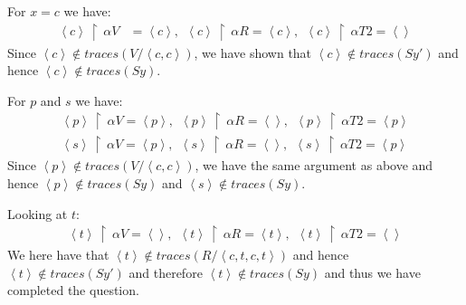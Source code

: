 \documentclass[11pt,a4paper]{article}
\def\filter{\,\upharpoonright\,}
\newcommand{\ab}[1]{\left \langle #1 \right \rangle}
\begin{document}
For $x = c$ we have:
\begin{align*}
    \ab{c} \filter \alpha V &= \ab{c},~~
    \ab{c} \filter \alpha R = \ab{c},~~
    \ab{c} \filter \alpha T2 = \ab{ }
\end{align*}
Since $\ab{c} \not \in traces(V/\ab{c,c})$, we have shown that $\ab{c} \not \in
traces(Sy')$ and hence $\ab{c} \not \in traces(Sy)$.

For $p$ and $s$ we have:
\begin{align*}
    \ab{p} \filter \alpha V = \ab{p},~~
    \ab{p} \filter \alpha R = \ab{ },~~
    \ab{p} \filter \alpha T2 = \ab{p} \\
    \ab{s} \filter \alpha V = \ab{p},~~
    \ab{s} \filter \alpha R = \ab{ },~~
    \ab{s} \filter \alpha T2 = \ab{p}
\end{align*}
Since $\ab{p} \not \in traces(V/\ab{c,c})$, we have the same argument as above
and hence $\ab{p} \not \in traces(Sy)$ and $\ab{s} \not \in traces(Sy)$.

Looking at $t$:
\begin{align*}
    \ab{t} \filter \alpha V = \ab{ },~~
    \ab{t} \filter \alpha R = \ab{t},~~
    \ab{t} \filter \alpha T2 = \ab{ }
\end{align*}
We here have that $\ab{t} \not \in traces(R/\ab{c,t,c,t})$ and hence $\ab{t}
\not \in traces(Sy')$ and therefore $\ab{t} \not \in traces(Sy)$ and thus we
have completed the question.
\end{document}
